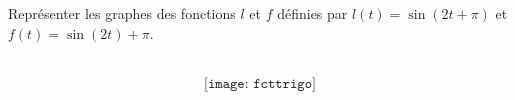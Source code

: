 \documentclass[12pt,french,oneside,a4paper]{memoir} %
\begin{document}
\begin{exo}
 Représenter les graphes des fonctions $l$ et $f$ définies par
  $l(t) = \sin(2t+\pi)$ et $f(t) = \sin(2t) + \pi$.
  \begin{correction}
    ~
  \begin{equation*}
    \texttt{[image: fcttrigo]}
  \end{equation*}
\end{correction}
\end{exo}





\end{document}
